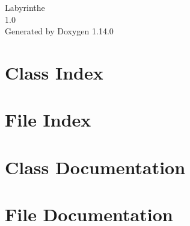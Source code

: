 \documentclass[twoside]{book}
\newcommand{\+}{\discretionary{\mbox{\scriptsize$\hookleftarrow$}}{}{}}
\newcommand{\clearemptydoublepage}{%
    \newpage{\pagestyle{empty}\cleardoublepage}%
  }
\begin{document}
  \raggedbottom
    \hypersetup{pageanchor=false,
                bookmarksnumbered=true,
                pdfencoding=unicode
               }
  \begin{titlepage}
  \vspace*{7cm}
  \begin{center}%
  {\Large Labyrinthe}\\
  [1ex]\large 1.\+0 \\
  \vspace*{1cm}
  {\large Generated by Doxygen 1.14.0}\\
  \end{center}
  \end{titlepage}
  \clearemptydoublepage
  \tableofcontents
  \clearemptydoublepage
  \hypersetup{pageanchor=true}
\chapter{Class Index}

\chapter{File Index}

\chapter{Class Documentation}





\chapter{File Documentation}










  \backmatter
  \newpage
  \clearemptydoublepage
  \printindex
\end{document}
